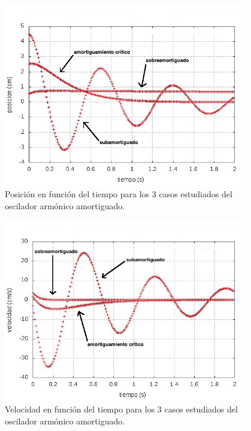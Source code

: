 \documentclass[a4paper,12pt]{article}
\begin{document}
\begin{figure}[H]
\begin{center}
\includegraphics[height=8cm]{grafico_ej2_xVSt.jpg}
\caption[width=5cm]{Posici\'on en funci\'on del tiempo para los 3 casos estudiados del oscilador arm\'onico amortiguado.}
\end{center}
\end{figure}

\begin{figure}[H]
\begin{center}
\includegraphics[height=8cm]{grafico_ej2_vVSt.jpg}
\caption[width=5cm]{Velocidad en funci\'on del tiempo para los 3 casos estudiados del oscilador arm\'onico amortiguado.}
\end{center}
\end{figure}
\end{document}
